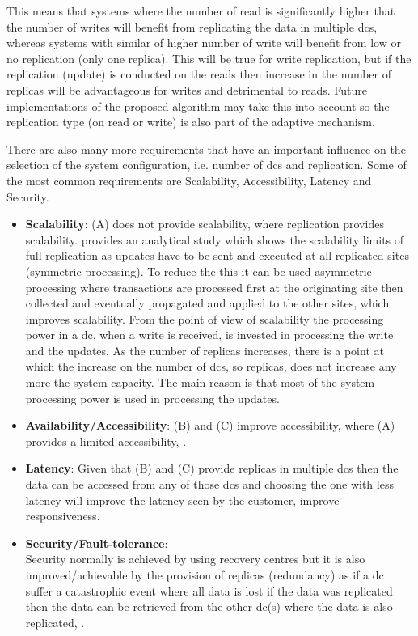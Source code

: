 \documentclass{acm_proc_article-sp}
\begin{document}
This means that systems where the number of read is significantly higher that the number of writes will benefit from replicating the data in multiple \glspl{dc}, whereas systems with similar of higher number of write will benefit from low or no replication (only one replica). This will be true for write replication, but if the replication (update) is conducted on the reads then increase in the number of replicas will be advantageous for writes and detrimental to reads. Future implementations of the proposed algorithm may take this into account so the replication type (on read or write) is also part of the adaptive mechanism.

There are also many more requirements that have an important influence on the selection of the system configuration, i.e. number of \glspl{dc} and replication. Some of the most common requirements are Scalability, Accessibility, Latency and Security.
\begin{itemize}
	\item {\bf Scalability}: 
	(A) does not provide scalability, where replication provides scalability. \cite{Jimenez-Peris2003a} provides an analytical study which shows the scalability limits of full replication as updates have to be sent and executed at all replicated sites (symmetric processing). To reduce the this it can be used asymmetric processing where transactions are processed first at the originating site then collected and eventually propagated and applied to the other sites, which improves scalability. From the point of view of scalability the processing power in a \gls{dc}, when a write is received, is invested in processing the write and the updates. As the number of replicas increases, there is a point at which the increase on the number of \glspl{dc}, so replicas, does not increase any more the system capacity. The main reason is that most of the system processing power is used in processing the updates. 

	\item {\bf Availability/Accessibility}: 
	(B) and (C) improve accessibility, where (A) provides a limited accessibility, \cite{Ladin1992a}.

	\item {\bf Latency}: 
	Given that (B) and (C) provide replicas in multiple \glspl{dc} then the data can be accessed from any of those \glspl{dc} and choosing the one with less latency will improve the latency seen by the customer, improve responsiveness.

	\item {\bf Security/Fault-tolerance}:\\
	Security normally is achieved by using recovery centres but it is also improved/achievable by the provision of replicas (redundancy) as if a \gls{dc} suffer a catastrophic event where all data is lost if the data was replicated then the data can be retrieved from the other \gls{dc}(s) where the data is also replicated, \cite{Guerraoui1996a, Neumann1956a}.
\end{itemize}
\end{document}
